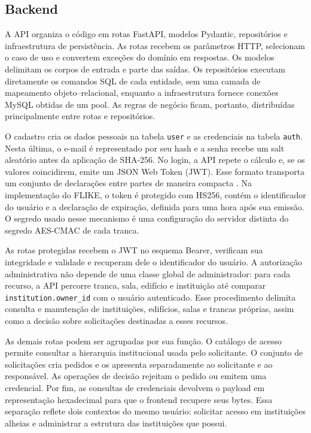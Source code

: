 \subsection{Backend}

A API organiza o código em rotas FastAPI, modelos Pydantic, repositórios e infraestrutura de persistência. As rotas recebem os parâmetros HTTP, selecionam o caso de uso e convertem exceções do domínio em respostas. Os modelos delimitam os corpos de entrada e parte das saídas. Os repositórios executam diretamente os comandos SQL de cada entidade, sem uma camada de mapeamento objeto--relacional, enquanto a infraestrutura fornece conexões MySQL obtidas de um pool. As regras de negócio ficam, portanto, distribuídas principalmente entre rotas e repositórios.

O cadastro cria os dados pessoais na tabela \texttt{user} e as credenciais na tabela \texttt{auth}. Nesta última, o e-mail é representado por seu hash e a senha recebe um salt aleatório antes da aplicação de SHA-256. No login, a API repete o cálculo e, se os valores coincidirem, emite um JSON Web Token (JWT). Esse formato transporta um conjunto de declarações entre partes de maneira compacta \cite{jones2015jwt}. Na implementação do FLIKE, o token é protegido com HS256, contém o identificador do usuário e a declaração de expiração, definida para uma hora após sua emissão. O segredo usado nesse mecanismo é uma configuração do servidor distinta do segredo AES-CMAC de cada tranca.

As rotas protegidas recebem o JWT no esquema Bearer, verificam sua integridade e validade e recuperam dele o identificador do usuário. A autorização administrativa não depende de uma classe global de administrador: para cada recurso, a API percorre tranca, sala, edifício e instituição até comparar \texttt{institution.owner\_id} com o usuário autenticado. Esse procedimento delimita consulta e manutenção de instituições, edifícios, salas e trancas próprias, assim como a decisão sobre solicitações destinadas a esses recursos.

As demais rotas podem ser agrupadas por sua função. O catálogo de acesso permite consultar a hierarquia institucional usada pelo solicitante. O conjunto de solicitações cria pedidos e os apresenta separadamente ao solicitante e ao responsável. As operações de decisão rejeitam o pedido ou emitem uma credencial. Por fim, as consultas de credenciais devolvem o payload em representação hexadecimal para que o frontend recupere seus bytes. Essa separação reflete dois contextos do mesmo usuário: solicitar acesso em instituições alheias e administrar a estrutura das instituições que possui.


